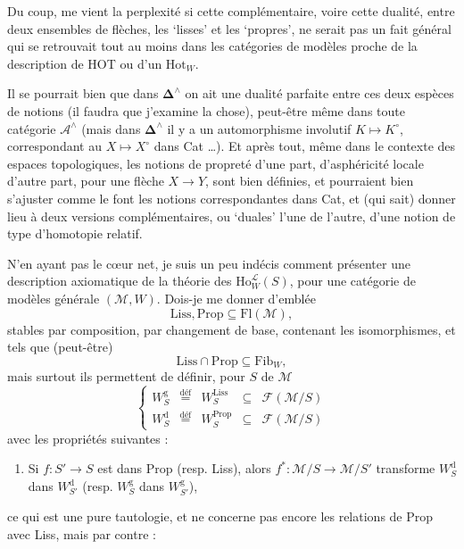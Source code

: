 \documentclass[11pt]{article}
\newcommand{\printedpage}[1]{{\reversemarginpar\marginnote{\raggedleft\scriptsize ed.~#1}}}
\newcommand{\msp}[1]{\marginpar{\raggedright\scriptsize ms.~#1}}
\newcommand{\circled}[1]{\tikz[baseline=(c.base)]\node[draw,circle,inner sep=1pt](c){#1};}
\newcommand{\deff}{\overset{\text{déf}}{=}}
\begin{document}
Du coup, me vient la perplexité si cette complémentaire, voire cette dualité, entre deux ensembles de flèches, les `lisses' et les `propres', ne serait pas un fait général qui se retrouvait tout au moins dans les catégories de modèles proche de la description de HOT ou d'un $\mathrm{Hot}_W$.

\msp{page 225}

Il se pourrait bien que dans $\boldsymbol{\Delta}^\wedge$ on ait une dualité parfaite entre ces deux espèces de notions (il faudra que j'examine la chose), peut-être même dans toute catégorie $\mathcal{A}^\wedge$ (mais dans $\boldsymbol{\Delta}^\wedge$ il y a un automorphisme involutif $K \longmapsto K^\circ$, correspondant au $X \longmapsto X^\circ$ dans Cat \dots). Et après tout, même dans le contexte des espaces topologiques, les notions de propreté d'une part, d'asphéricité locale d'autre part, pour une flèche $X \longrightarrow Y$, sont bien définies, et pourraient bien s'ajuster comme le font les notions correspondantes dans Cat, et (qui sait) donner lieu à deux versions complémentaires, ou `duales' l'une de l'autre, d'une notion de type d'homotopie relatif.

N'en ayant pas le cœur net, je suis un peu indécis comment présenter une description axiomatique de la théorie des $\mathrm{Ho}^{\mathcal{L}}_W(S)$, pour une catégorie de modèles générale $(\mathcal{M},W)$. Dois-je me donner d'emblée
\[
\mathrm{Liss}, \mathrm{Prop} \subseteq \mathrm{Fl}(\mathcal{M}),
\]
stables par composition, par changement de base, contenant les isomorphismes, et tels que (peut-être)
\[
\mathrm{Liss} \cap \mathrm{Prop} \subseteq \mathrm{Fib}_W,
\]
\msp{page 226}
mais surtout ils permettent de définir, pour $S$ de $\mathcal{M}$
\[
\left\{
\begin{array}{lcccl}
W^{\mathrm{g}}_S & \deff & W^{\mathrm{Liss}}_S & \subseteq & \mathcal{F}(\mathcal{M}/S)\\
W^{\mathrm{d}}_S & \deff & W^{\mathrm{Prop}}_S & \subseteq & \mathcal{F}(\mathcal{M}/S)
\end{array}
\right.
\]
avec les propriétés suivantes :

\begin{enumerate}
\item[{\circled{a}}] Si $f : S' \longrightarrow S$ est dans Prop (resp. Liss), alors $f^* : \mathcal{M}/S \longrightarrow \mathcal{M}/S'$ transforme $W^{\mathrm{d}}_S$ dans $W^{\mathrm{d}}_{S'}$ (resp. $W^{\mathrm{g}}_S$ dans $W^{\mathrm{g}}_{S'}$),
\end{enumerate}
\printedpage{144}
\noindent ce qui est une pure tautologie, et ne concerne pas encore les relations de Prop avec Liss, mais par contre :
\end{document}
